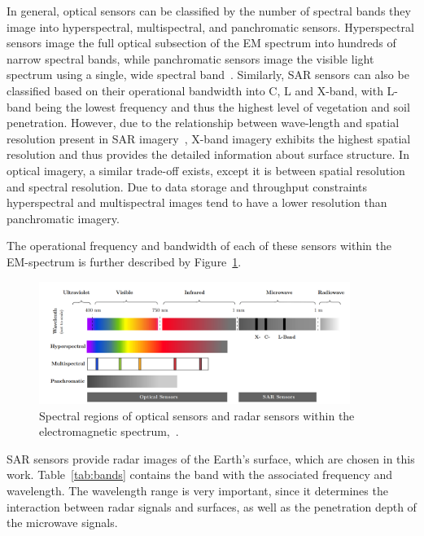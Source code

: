 In general, optical sensors can be classified by the number of spectral bands they image into hyperspectral, multispectral, and panchromatic sensors. 
Hyperspectral sensors image the full optical subsection of the EM spectrum into hundreds of narrow spectral bands, while panchromatic sensors image the visible light spectrum using a single, wide spectral band~\citep{Sara2021}.
Similarly, SAR sensors can also be classified based on their operational bandwidth into C, L and X-band, with L-band being the lowest frequency and thus the highest level of vegetation and soil penetration.
However, due to the relationship between wave-length and spatial resolution present in SAR imagery~\citep{cumming2005digital}, X-band imagery exhibits the highest spatial resolution and thus provides the detailed information about surface structure. 
In optical imagery, a similar trade-off exists, except it is between spatial resolution and spectral resolution. 
Due to data storage and throughput constraints hyperspectral and multispectral images tend to have a lower resolution than panchromatic imagery.

The operational frequency and bandwidth of each of these sensors within the EM-spectrum is further described by Figure~\ref{fig:EM-spectrum}.
	\begin{figure}[H]
    \centering
    \includegraphics[width=0.9\textwidth]{../../Images/PNG/sensor.png}
    \caption[Spectral regions of sensors within the electromagnetic spectrum.]{Spectral regions of optical sensors and radar sensors within the electromagnetic spectrum,~\citep{zhang2022synthetic}.}
    \label{fig:EM-spectrum}
\end{figure}
SAR sensors provide radar images of the Earth’s surface, which are chosen in this work.
Table~\ref{tab:bands} contains the band with the associated frequency and wavelength. 
The wavelength range is very important, since it determines the interaction between radar signals and surfaces, as well as the penetration depth of the microwave
signals.



